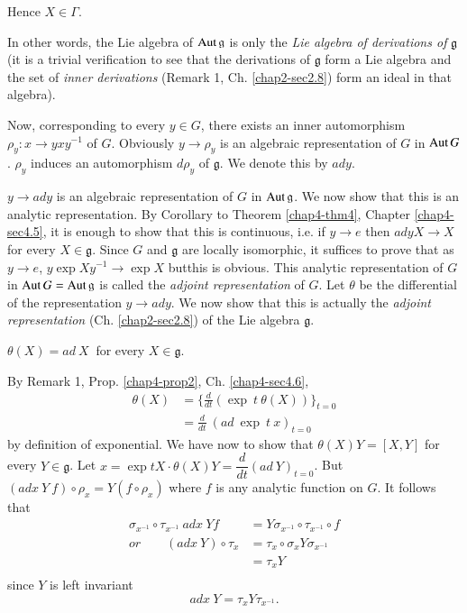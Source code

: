 Hence   $X \in  \Gamma$.

In other words, the Lie algebra of $\operatorname{Aut} \mathfrak{g}$ is only the
{\em Lie algebra of  derivations of}  $\mathfrak{g}$ 
(it is a trivial verification to see that the derivations of $\mathfrak{g}$
form a Lie algebra and
the set of {\em inner derivations} (Remark 1, Ch. \ref{chap2-sec2.8})
form an ideal in that algebra). 
 
 Now, corresponding to every $y \in G$, there exists an inner
 automorphism $\rho_y : x \rightarrow y x y^{-1}$  of
 $G$. Obviously 
$y \rightarrow \rho_y$ is an algebraic representation of $G$ in $\operatorname{Aut}
 G$. $\rho_y$ induces an automorphism $d  \rho_y$ of  $\mathfrak{g}$.  
 We denote this by $ady$.
 
 $y \rightarrow  ady$ is an algebraic representation of $G$ in $\operatorname{Aut}
 \mathfrak{g} $. 
  We now show that this is an analytic representation. By Corollary to 
  Theorem \ref{chap4-thm4}, Chapter \ref{chap4-sec4.5}, it is enough
  to show that this is 
  continuous, i.e. if $y \rightarrow e$ then $adyX \rightarrow X$ for
  every $X \in \mathfrak{g}$. Since $G$ and  $ \mathfrak{g}$ are
  locally isomorphic, it suffices to prove that as $ y \rightarrow e$,
  $y\exp Xy^{-1}\rightarrow \exp X$ 
  but\pageoriginale this is obvious. This analytic representation of
  $G $ in $\operatorname{Aut} G=\operatorname{Aut} \mathfrak{g}$ is called the \textit{adjoint
    representation} of 
  $G$. Let $\theta$ be the differential of the representation $ y
  \rightarrow  ady$. We now show that this is actually the
  \textit{adjoint representation} (Ch. \ref{chap2-sec2.8}) of the Lie algebra
  $\mathfrak{g}$. 

\begin{thm}\label{chap4-thm}%
$\theta (X)=ad~ X~$ for every  $X \in \mathfrak{g}$.
\end{thm}

By Remark 1, Prop. \ref{chap4-prop2},  Ch. \ref{chap4-sec4.6},
\begin{align*}
  \theta  (X)  &= \{\frac {d}{dt}(\exp~t~ \theta (X))\}_{t=0} \\
	&=\frac{d}{dt}~(ad~\exp~t~ x)_{t=0} 
\end{align*}
by definition of exponential. We have now to show that $\theta (X) Y
=[X,Y]$ for every $Y \in \mathfrak{g}$. Let $x=\exp t X\cdot \theta (X)Y=
\dfrac {d} {dt} (ad~Y)_{t=0}$.  But $(adx~Y~f) \circ \rho_x =
Y(f\circ \rho_x)$ where $f$ is any analytic function on $G$. 
It follows that
\begin{align*}
 \sigma_{x^{-1}} \circ \tau_{x^{-1}}~adx~Yf & =Y \sigma_{x^{-1}} \circ
   \tau_{x^{-1}} \circ f\\  
  or \qquad (adx~Y)\circ \tau_x  &= \tau_x\circ \sigma_x
  Y\sigma_{x^{-1}}\\ 
&  =\tau_x Y\\ 
\end{align*}
since $Y$ is left invariant
$$ 
adx~ Y =\tau_x Y\tau_{x^{-1}}.
$$

